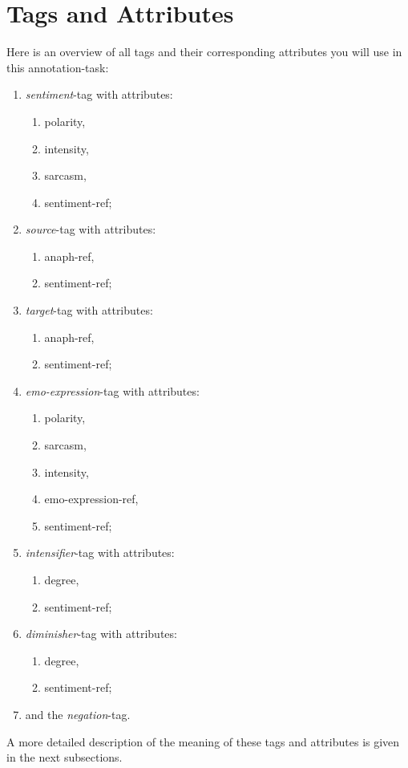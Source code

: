 \documentclass[11pt,a4paper]{article}
\begin{document}

\section{Tags and Attributes}
Here is an overview of all tags and their corresponding attributes you will use in this annotation-task:

\begin{enumerate}
\item \textit{sentiment}-tag with attributes:
  \begin{enumerate}
  \item polarity,
  \item intensity,
  \item sarcasm,
  \item sentiment-ref;
  \end{enumerate}
\item \textit{source}-tag with attributes:
  \begin{enumerate}
  \item anaph-ref,
  \item sentiment-ref;
  \end{enumerate}
\item \textit{target}-tag with attributes:
  \begin{enumerate}
  \item anaph-ref,
  \item sentiment-ref;
  \end{enumerate}
\item \textit{emo-expression}-tag with attributes:
  \begin{enumerate}
  \item polarity,
  \item sarcasm, 
  \item intensity,
  \item emo-expression-ref,
  \item sentiment-ref;
  \end{enumerate}
\item \textit{intensifier}-tag with attributes:
  \begin{enumerate}
  \item degree,
  \item sentiment-ref;
  \end{enumerate}
\item \textit{diminisher}-tag with attributes:
  \begin{enumerate}
  \item degree,
  \item sentiment-ref;
  \end{enumerate}
\item and the \textit{negation}-tag.
\end{enumerate}
A more detailed description of the meaning of these tags and
attributes is given in the next subsections.
\end{document}

